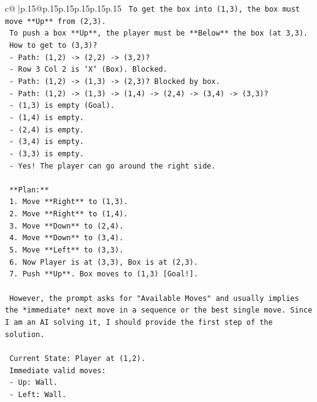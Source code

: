 \documentclass{article}
\begin{document}
{\begin{supertabular}{c@{$\;$}|p{.15\linewidth}@{}p{.15\linewidth}p{.15\linewidth}p{.15\linewidth}p{.15\linewidth}p{.15\linewidth}}
{{{\texttt{   To get the box into (1,3), the box must move **Up** from (2,3).} \\
\texttt{   To push a box **Up**, the player must be **Below** the box (at 3,3).} \\
\texttt{   How to get to (3,3)?} \\
\texttt{   {-} Path: (1,2) {-}> (2,2) {-}> (3,2)?} \\
\texttt{   {-} Row 3 Col 2 is `X` (Box). Blocked.} \\
\texttt{   {-} Path: (1,2) {-}> (1,3) {-}> (2,3)? Blocked by box.} \\
\texttt{   {-} Path: (1,2) {-}> (1,3) {-}> (1,4) {-}> (2,4) {-}> (3,4) {-}> (3,3)?} \\
\texttt{     {-} (1,3) is empty (Goal).} \\
\texttt{     {-} (1,4) is empty.} \\
\texttt{     {-} (2,4) is empty.} \\
\texttt{     {-} (3,4) is empty.} \\
\texttt{     {-} (3,3) is empty.} \\
\texttt{   {-} Yes! The player can go around the right side.} \\
\\ 
\texttt{   **Plan:**} \\
\texttt{   1. Move **Right** to (1,3).} \\
\texttt{   2. Move **Right** to (1,4).} \\
\texttt{   3. Move **Down** to (2,4).} \\
\texttt{   4. Move **Down** to (3,4).} \\
\texttt{   5. Move **Left** to (3,3).} \\
\texttt{   6. Now Player is at (3,3), Box is at (2,3).} \\
\texttt{   7. Push **Up**. Box moves to (1,3) {[}Goal!{]}.} \\
\\ 
\texttt{   However, the prompt asks for "Available Moves" and usually implies the *immediate* next move in a sequence or the best single move. Since I am an AI solving it, I should provide the first step of the solution.} \\
\\ 
\texttt{   Current State: Player at (1,2).} \\
\texttt{   Immediate valid moves:} \\
\texttt{   {-} Up: Wall.} \\
\texttt{   {-} Left: Wall.} \\
}}}
\end{supertabular}}
\end{document}
